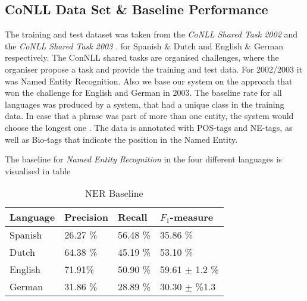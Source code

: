 \documentclass[11pt]{article}
\begin{document}
\subsection*{CoNLL Data Set \& Baseline Performance}
The training and test dataset was taken from the \emph{CoNLL Shared Task 2002} \cite{tksintro2002conll} and the \emph{CoNLL Shared Task 2003} \cite{TjongKimSang:2003:ICS:1119176.1119195}.
for Spanish \& Dutch and English \& German respectively. The ConNLL shared tasks are organised challenges, where the organiser propose a task and provide the
training and test data. For 2002/2003 it was Named Entity Recognition. Also we base our system on the approach that won the challenge for English and German in 2003. 
The baseline rate for all languages was produced by a system, that had a unique class in the training data. In case that a phrase was part of more than one entity, 
the system would choose the longest one \cite{TjongKimSang:2003:ICS:1119176.1119195}. 
The data is annotated with POS-tags and NE-tags, as well as Bio-tags that indicate the position in the Named Entity. 

The baseline for \emph{Named Entity Recognition} in the four different languages is visualised in table \
\begin{table}[h!]
\scriptsize
\begin{tabular}{l|l|l|l}
\hline
\bf Language & \bf Precision & \bf Recall & \bf $F_1$-measure \\ \hline
Spanish &             26.27 \% & 56.48 \% & 35.86  \%        \\
Dutch  &             64.38 \%  &45.19   \%    & 53.10 \%  \\
English &              71.91\%& 50.90 \%  & 59.61 $\pm$ 1.2 \%\\
German &      31.86 \%  & 28.89 \% & 30.30  $\pm$ \%1.3 \\
\end{tabular}
\caption{NER Baseline}
\label{table:Base}
\end{table}
\end{document}

